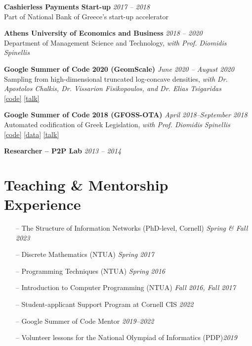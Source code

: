 \documentclass[margin]{res}
\newcommand{\field}[2]{\noindent \textbf{#1} \hfill #2 \\}
\newcommand{\specialurl}[2]{\href {#2} {{{[#1]}}}}
\newcommand{\code}[1]{\specialurl {code} {#1}}
\newcommand{\data}[1]{\specialurl {data} {#1}}
\newcommand{\talk}[1]{\specialurl {talk} {#1}}
\begin{document}
\begin{resume}
\field{Cashierless Payments Start-up}{\emph{2017 -- 2018}}{Part of National Bank of Greece's start-up accelerator}

\field{Athens University of Economics and Business}{\emph{2018 -- 2020}}{Department of Management Science and Technology, \emph{with Prof. Diomidis Spinellis}}

\field{Google Summer of Code 2020 (GeomScale)}{\emph{June 2020 -- August 2020}}{{Sampling from high-dimensional truncated log-concave densities, \emph{with Dr. Apostolos Chalkis, Dr. Vissarion Fisikopoulos, and Dr. Elias Tsigaridas}} \\ \code{https://GeomScale/volesti} \talk{https://www.youtube.com/watch?v=P7YfC8Nn6sY}}

\field{Google Summer of Code 2018 (GFOSS-OTA)}{\emph{April 2018--September 2018}}{Automated codification of Greek Legislation, \emph{with Prof. Diomidis Spinellis} \\ \code{https://github.com/eellak/gsoc2018-3gm} \data{https://archive.org/details/greekgovernmentgazette} \talk{https://www.youtube.com/watch?v=_UIGsy85Ehw}}


\field{Researcher -- P2P Lab}{\emph{2013 -- 2014}}{}



\section{Teaching \& Mentorship \\ Experience} 
\begin{itemize}[nosep]
	\item[--] The Structure of Information Networks (PhD-level, Cornell) \hfill \emph{Spring \& Fall 2023} 
    \item[--] Discrete Mathematics (NTUA) \hfill \emph{Spring 2017}
    \item[--] Programming Techniques (NTUA) \hfill \emph{Spring 2016}
    \item[--] Introduction to Computer Programming (NTUA) \hfill \emph{Fall 2016, Fall 2017}
\end{itemize}

\medskip

\begin{itemize}[nosep]
	\item[--] Student-applicant Support Program at Cornell CIS \hfill \emph{2022}
	\item[--] Google Summer of Code Mentor \hfill \emph{2019--2022}
	\item[--] Volunteer lessons for the National Olympiad of Informatics (PDP)\hfill \emph{2019}
\end{itemize}



\end{resume}
\end{document}
